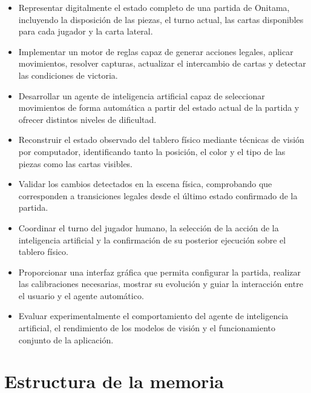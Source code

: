 \begin{itemize}
    \item Representar digitalmente el estado completo de una partida de Onitama, incluyendo la disposición de las piezas, el turno actual, las cartas disponibles para cada jugador y la carta lateral.

    \item Implementar un motor de reglas capaz de generar acciones legales, aplicar movimientos, resolver capturas, actualizar el intercambio de cartas y detectar las condiciones de victoria.

    \item Desarrollar un agente de inteligencia artificial capaz de seleccionar movimientos de forma automática a partir del estado actual de la partida y ofrecer distintos niveles de dificultad.

    \item Reconstruir el estado observado del tablero físico mediante técnicas de visión por computador, identificando tanto la posición, el color y el tipo de las piezas como las cartas visibles.

    \item Validar los cambios detectados en la escena física, comprobando que corresponden a transiciones legales desde el último estado confirmado de la partida.

    \item Coordinar el turno del jugador humano, la selección de la acción de la inteligencia artificial y la confirmación de su posterior ejecución sobre el tablero físico.

    \item Proporcionar una interfaz gráfica que permita configurar la partida, realizar las calibraciones necesarias, mostrar su evolución y guiar la interacción entre el usuario y el agente automático.

    \item Evaluar experimentalmente el comportamiento del agente de inteligencia artificial, el rendimiento de los modelos de visión y el funcionamiento conjunto de la aplicación.
\end{itemize}


\section{Estructura de la memoria}
\label{sec:estructura-memoria}

